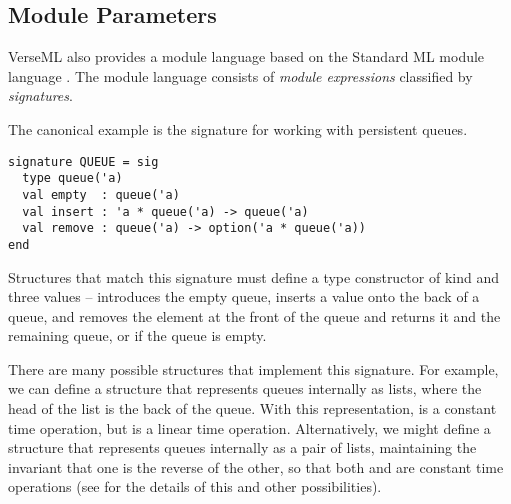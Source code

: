 \subsection{Module Parameters}\label{sec:module-parameters}
VerseML also provides a module language based on the Standard ML module language \cite{MacQueen:1984:MSM:800055.802036}. The module language consists of \emph{module expressions} classified by \emph{signatures}. %


The canonical example is the signature for working with persistent queues.
\begin{lstlisting}[numbers=none]
signature QUEUE = sig
  type queue('a)
  val empty  : queue('a)
  val insert : 'a * queue('a) -> queue('a)
  val remove : queue('a) -> option('a * queue('a))
end 
\end{lstlisting}
Structures that match this signature must define a type constructor  of kind  and three values --  introduces the empty queue,  inserts a value onto the back of a queue, and  removes the element at the front of the queue and returns it and the remaining queue, or  if the queue is empty.%

There are many possible structures that implement this signature. For example, we can define a structure  that represents queues internally as lists, where the head of the list is the back of the queue. With this representation,  is a constant time operation, but  is a linear time operation. Alternatively, we might define a structure  that represents queues internally as a pair of lists, maintaining the invariant that one is the reverse of the other, so that both  and  are constant time operations (see \cite{harper1997programming} for the details of this and other possibilities). 

